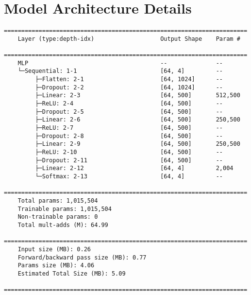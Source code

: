 \chapter{Model Architecture Details} \label{app:arch_details}


\begin{lstlisting}[caption=\acrfull{mlp}]
    ======================================================================
    Layer (type:depth-idx)                   Output Shape    Param #
    ======================================================================
    MLP                                      --              --
    └─Sequential: 1-1                        [64, 4]         --
         ├─Flatten: 2-1                      [64, 1024]      --
         ├─Dropout: 2-2                      [64, 1024]      --
         ├─Linear: 2-3                       [64, 500]       512,500
         ├─ReLU: 2-4                         [64, 500]       --
         ├─Dropout: 2-5                      [64, 500]       --
         ├─Linear: 2-6                       [64, 500]       250,500
         ├─ReLU: 2-7                         [64, 500]       --
         ├─Dropout: 2-8                      [64, 500]       --
         ├─Linear: 2-9                       [64, 500]       250,500
         ├─ReLU: 2-10                        [64, 500]       --
         ├─Dropout: 2-11                     [64, 500]       --
         ├─Linear: 2-12                      [64, 4]         2,004
         └─Softmax: 2-13                     [64, 4]         --
    ======================================================================
    Total params: 1,015,504
    Trainable params: 1,015,504
    Non-trainable params: 0
    Total mult-adds (M): 64.99
    ======================================================================
    Input size (MB): 0.26
    Forward/backward pass size (MB): 0.77
    Params size (MB): 4.06
    Estimated Total Size (MB): 5.09
    ======================================================================
\end{lstlisting}

